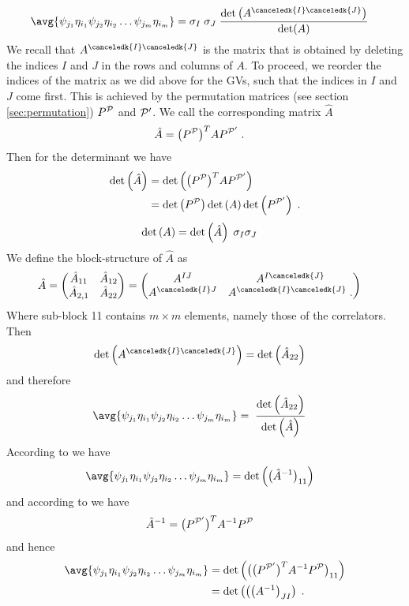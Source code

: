 %
\begin{align*}
\avg{\psi_{j_{1}}\eta_{i_{1}}\psi_{j_{2}}\eta_{i_{2}}\ldots \psi_{j_{m}}\eta_{i_{m}}}
&=\sigma_{I}\; \sigma_{J}
\;\frac{\det\big( A^{\canceledk{I}\canceledk{J}} \big)}{\det(A)}
\end{align*}
%
We recall that $A^{\canceledk{I}\canceledk{J}}$ is the matrix that is obtained by 
deleting the indices $I$ and $J$ in the rows and columns of $A$. 
To proceed, we reorder the indices of the matrix as we did above for the GVs, such that the indices in $I$ and $J$ come first. 
This is achieved by the permutation matrices (see section \ref{sec:permutation})
$P^{{\cal P}}$ and ${\cal P}'$.
We call the corresponding matrix $\hat   A$
%
\begin{align*}
\hat  A &= \big(P^{{\cal P}}\big)^{T} A P^{{\cal P}'}\;.
\end{align*}
%
Then for the determinant we have
%
\begin{align*}
\text{det}\left(\hat A\right) &= \text{det}\left(\big(P^{{\cal P}}\big)^{T} A P^{{\cal P}'}\right)\\
&=\text{det}\left(P^{{\cal P}}\right) \text{det}\left(A\right) \text{det}\left(P^{{\cal P}'}\right)\;.
\end{align*}
%
%
\begin{align*}
\text{det}\left(A\right)&=\text{det}\left(\hat A\right)\;\sigma_{I}\sigma_{J}
\end{align*}
%
We define the  block-structure of $\hat A$ as
%
\begin{align*}
\hat  A&= 
\begin{pmatrix}
\hat A_{11} &\hat A_{12}\\
\hat A_{2,1} & \hat A_{22}
\end{pmatrix}
=\begin{pmatrix}
 A^{IJ} & A^{I\canceledk{J}}\\
A^{\canceledk{I} J} &  A^{\canceledk{I}\canceledk{J}}\;.
\end{pmatrix}
\end{align*}
%
Where sub-block 11 contains $m\times m$ elements, namely those of the correlators. 
%
Then
%
\begin{align*}
\Det{A^{\canceledk{I}\canceledk{J}}}
&=\Det{\hat A_{22}}
\end{align*}
%
and therefore
\begin{align*}
\avg{\psi_{j_{1}}\eta_{i_{1}}\psi_{j_{2}}\eta_{i_{2}}\ldots \psi_{j_{m}}\eta_{i_{m}}}
&= \;\frac{\Det{ \hat A_{22} }}{\Det{\hat A}}
\end{align*}
%
According to  we have 
%
\begin{align*}
\avg{\psi_{j_{1}}\eta_{i_{1}}\psi_{j_{2}}\eta_{i_{2}}\ldots \psi_{j_{m}}\eta_{i_{m}}}&=
\Det{ \big(\hat A^{-1}\big)_{11}}
\end{align*}
%
and according to  we have
%
\begin{align*}
\hat A^{-1}&= \big(P^{{\cal P}'}\big)^{T} A^{-1} P^{{\cal P}}
\end{align*}
%
and hence
%
\begin{align*}
\avg{\psi_{j_{1}}\eta_{i_{1}}\psi_{j_{2}}\eta_{i_{2}}\ldots \psi_{j_{m}}\eta_{i_{m}}}
&=\Det{ \big(\big(P^{\cP'}\big)^{T} A^{-1} P^{\cP}\big)_{11}}\\
&=\Det{ \big(\big(A^{-1}\big)_{JI}}\;.
\end{align*}

